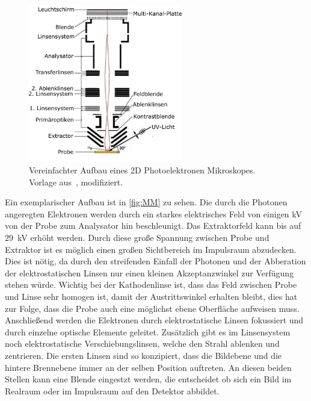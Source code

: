         \begin{figure}
            \centering
            \includegraphics[width=0.6\textwidth]{PEEM_schemaneu.png}
            \caption{Vereinfachter Aufbau eines 2D Photoelektronen Mikroskopes. Vorlage aus~\cite{KUCH}, modifiziert.}
            \label{fig:MM}
        \end{figure}
        Ein exemplarischer Aufbau ist in \autoref{fig:MM} zu sehen.
        Die durch die Photonen angeregten Elektronen werden durch ein starkes elektrisches Feld von einigen \si{\kilo\volt} von der Probe zum Analysator hin beschleunigt.
        Das Extraktorfeld kann bis auf \SI{29}{\kilo\volt} erhöht werden.
        Durch diese große Spannung zwischen Probe und Extraktor ist es möglich einen großen Sichtbereich im Impulsraum abzudecken.
        Dies ist nötig, da durch den streifenden Einfall der Photonen und der Abberation der elektrostatischen Linsen nur einen kleinen Akzeptanzwinkel zur Verfügung stehen würde.
        Wichtig bei der Kathodenlinse ist, dass das Feld zwischen Probe und Linse sehr homogen ist, damit der Austrittswinkel erhalten bleibt, dies hat zur Folge, dass die Probe auch eine möglichst ebene Oberfläche aufweisen muss.
        Anschließend werden die Elektronen durch elektrostatische Linsen fokussiert und durch einzelne optische Elemente geleitet.
        Zusätzlich gibt es im Linsensystem noch elektrostatische Verschiebungslinsen, welche den Strahl ablenken und zentrieren.
        Die ersten Linsen sind so konzipiert, dass die Bildebene und die hintere Brennebene immer an der selben Position auftreten.
        An diesen beiden Stellen kann eine Blende eingestzt werden, die entscheidet ob sich ein Bild im Realraum oder im Impulsraum auf den Detektor abbildet.

